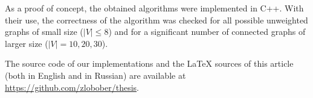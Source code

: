 As a proof of concept, the obtained algorithms were implemented in C++. With their use, the correctness of the algorithm was checked for all possible unweighted graphs of small size ($|V| \leq 8$) and for a significant number of connected graphs of larger size ($|V| = 10, 20, 30$). 









The source code of our implementations and the LaTeX sources of this article (both in English and in Russian) are available at \url{https://github.com/zlobober/thesis}.
